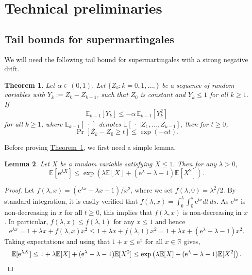 \documentclass[11pt]{article}
\newcommand{\E}{\mathbb{E}}
\newtheorem{theorem}{Theorem}[section]
\newtheorem{lemma}[theorem]{Lemma}
\theoremstyle{definition}
\newcommand{\expref}[2]{\texorpdfstring{\hyperref[#2]{#1~\ref{#2}}}{#1~\ref{#2}}}
\newcommand{\R}{{\mathbb R}}
\newcommand{\eee}{\mathrm e}
\begin{document}
\section{Technical preliminaries}
\label{s:prel}
\subsection{Tail bounds for supermartingales}
%
%
%
%
%
%
%
%

%
%
%
%

%
%
%
%
%
%

%
%

We will need the following tail bound for supermartingales with a strong negative drift.
\begin{theorem}
\label{lem:prel2}
Let $\alpha \in (0,1)$.
Let $\{Z_k: k=0,1,\ldots,\}$ be a sequence of random variables with $Y_k:=Z_k - Z_{k-1}$, such that $Z_0$ is constant %
and $Y_k\leq 1$ for all $k \geq 1$. If 
\[\E_{k-1}[Y_k] \le  -\alpha\, \E_{k-1}[Y_k^2]\]
for all $k\geq 1$, where $\E_{k-1}[\ \cdot \ ]$ denotes $ \E[\ \cdot \ | Z_1,\dots, Z_{k-1}]$, 
then for $t \geq 0$,
\[ \Pr[Z_k  - Z_0 \geq t] \leq \exp(-\alpha t).\]
\end{theorem}
Before proving \expref{Theorem}{lem:prel2}, we first need a simple lemma.
\begin{lemma}
\label{lem:prel1}
Let $X$ be a random variable satisfying $X\le 1$. Then for any $\lambda >0$,
\[\E[\eee^{\lambda X}] \le \exp\left(\lambda \E[X] +  (\eee^{\lambda} -\lambda-1 )\E[X^2]\right).\]\end{lemma}
\begin{proof}
%
%
%
%
%
%
Let $f(\lambda,x) = (\eee^{\lambda x} - \lambda x - 1)/x^2$, where we set $f(\lambda,0)=\lambda^2/2$. By standard integration, it is easily verified that 
$f(\lambda,x)  = \int_0^\lambda \int_0^s \eee^{tx} dt\, ds.$
As $\eee^{tx}$ is non-decreasing in $x$ for all $t\geq 0$, this implies that $f(\lambda,x)$ is  non-decreasing in $x$.
In particular, $f(\lambda,x) \leq f(\lambda,1)$ for any $x \leq 1$ and hence 
\[\eee^{\lambda x} = 1 + \lambda x +  f(\lambda,x) x^2  \leq 1 + \lambda x  + f(\lambda,1)x^2 = 1 + \lambda x +   (\eee^{\lambda} -\lambda-1 )x^2.\]
Taking expectations and using that $1+x \leq \eee^x$ for all $x \in \R$ gives,
\[ \E[\eee^{\lambda X}]  \leq  1+\lambda\E[ X]+(\eee^{\lambda} -\lambda-1 )\E [X^2]   \leq \exp \left(\lambda \E[X] +(\eee^{ \lambda} -\lambda-1 )\E [X^2]\right). \qedhere\]
\end{proof}
%
%
\end{document}
